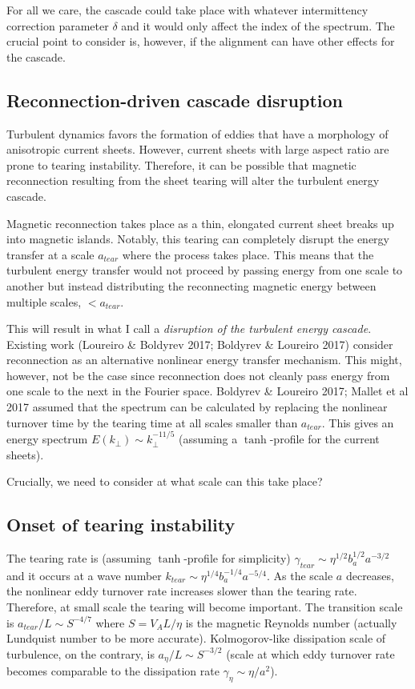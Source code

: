 \documentclass[usenatbib,twocolumn]{aastex63}
\begin{document}
\begin{appendix}
For all we care, the cascade could take place with whatever intermittency correction parameter $\delta$ and it would only affect the index of the spectrum.
The crucial point to consider is, however, if the alignment can have other effects for the cascade.



\subsection{Reconnection-driven cascade disruption}

Turbulent dynamics favors the formation of eddies that have a morphology of anisotropic current sheets.
However, current sheets with large aspect ratio are prone to tearing instability.
Therefore, it can be possible that magnetic reconnection resulting from the sheet tearing will alter the turbulent energy cascade.

Magnetic reconnection takes place as a thin, elongated current sheet breaks up into magnetic islands.
Notably, this tearing can completely disrupt the energy transfer at a scale $a_{tear}$ where the process takes place.
This means that the turbulent energy transfer would not proceed by passing energy from one scale to another but instead distributing the reconnecting magnetic energy between multiple scales, $<a_{tear}$.

This will result in what I call a \textit{disruption of the turbulent energy cascade}.
Existing work (Loureiro \& Boldyrev 2017; Boldyrev \& Loureiro 2017) consider reconnection as an alternative nonlinear energy transfer mechanism. 
This might, however, not be the case since reconnection does not cleanly pass energy from one scale to the next in the Fourier space.
Boldyrev \& Loureiro 2017; Mallet et al 2017 assumed that the spectrum can be calculated by replacing the nonlinear turnover time by the tearing time at all scales smaller than $a_{tear}$.
This gives an energy spectrum $E(k_\perp) \sim k_\perp^{-11/5}$ (assuming a $\tanh$-profile for the current sheets).

Crucially, we need to consider at what scale can this take place?


\subsection{Onset of tearing instability}


The tearing rate is (assuming $\tanh$-profile for simplicity) $\gamma_{tear} \sim \eta^{1/2} b_a^{1/2} a^{-3/2}$ and it occurs at a wave number $k_{tear} \sim \eta^{1/4} b_a^{-1/4} a^{-5/4}$.
As the scale $a$ decreases, the nonlinear eddy turnover rate increases slower than the tearing rate.
Therefore, at small scale the tearing will become important.
The transition scale is $a_{tear}/L \sim S^{-4/7}$ where $S = V_A L/\eta$ is the magnetic Reynolds number (actually Lundquist number to be more accurate).
Kolmogorov-like dissipation scale of turbulence, on the contrary, is $a_\eta/L \sim S^{-3/2}$ (scale at which eddy turnover rate becomes comparable to the dissipation rate $\gamma_\eta \sim \eta/a^2$).


\end{appendix}
\end{document}

